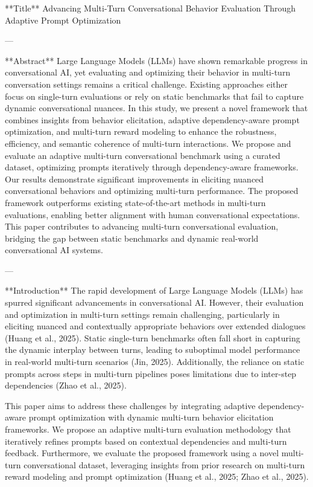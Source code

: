 **Title**  
Advancing Multi-Turn Conversational Behavior Evaluation Through Adaptive Prompt Optimization  

---

**Abstract**  
Large Language Models (LLMs) have shown remarkable progress in conversational AI, yet evaluating and optimizing their behavior in multi-turn conversation settings remains a critical challenge. Existing approaches either focus on single-turn evaluations or rely on static benchmarks that fail to capture dynamic conversational nuances. In this study, we present a novel framework that combines insights from behavior elicitation, adaptive dependency-aware prompt optimization, and multi-turn reward modeling to enhance the robustness, efficiency, and semantic coherence of multi-turn interactions. We propose and evaluate an adaptive multi-turn conversational benchmark using a curated dataset, optimizing prompts iteratively through dependency-aware frameworks. Our results demonstrate significant improvements in eliciting nuanced conversational behaviors and optimizing multi-turn performance. The proposed framework outperforms existing state-of-the-art methods in multi-turn evaluations, enabling better alignment with human conversational expectations. This paper contributes to advancing multi-turn conversational evaluation, bridging the gap between static benchmarks and dynamic real-world conversational AI systems.

---

**Introduction**  
The rapid development of Large Language Models (LLMs) has spurred significant advancements in conversational AI. However, their evaluation and optimization in multi-turn settings remain challenging, particularly in eliciting nuanced and contextually appropriate behaviors over extended dialogues (Huang et al., 2025). Static single-turn benchmarks often fall short in capturing the dynamic interplay between turns, leading to suboptimal model performance in real-world multi-turn scenarios (Jin, 2025). Additionally, the reliance on static prompts across steps in multi-turn pipelines poses limitations due to inter-step dependencies (Zhao et al., 2025).  

This paper aims to address these challenges by integrating adaptive dependency-aware prompt optimization with dynamic multi-turn behavior elicitation frameworks. We propose an adaptive multi-turn evaluation methodology that iteratively refines prompts based on contextual dependencies and multi-turn feedback. Furthermore, we evaluate the proposed framework using a novel multi-turn conversational dataset, leveraging insights from prior research on multi-turn reward modeling and prompt optimization (Huang et al., 2025; Zhao et al., 2025).  

